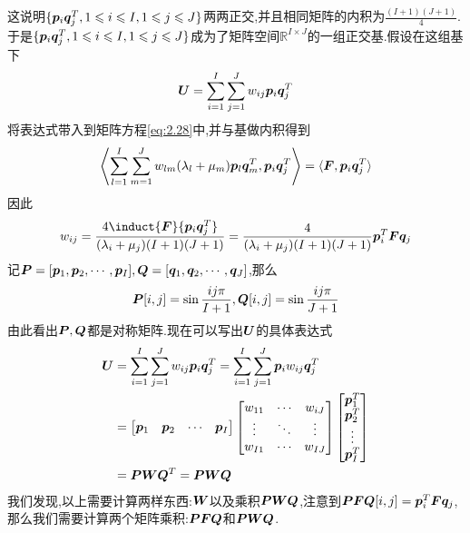 这说明$\{\bm{p}_i\bm{q}_j^T,1\leqslant i\leqslant I,1\leqslant j\leqslant J\}$两两正交,并且相同矩阵的内积为$\frac{(I+1)(J+1)}{4}$.于是$\{\bm{p}_i\bm{q}_j^T,1\leqslant i\leqslant I,1\leqslant j\leqslant J\}$成为了矩阵空间$\mathbb{R}^{I\times J}$的一组正交基.假设在这组基下
$$
\bm{U}=\sum_{i=1}^I\sum_{j=1}^Jw_{ij}\bm{p}_i\bm{q}_j^T
$$
将表达式带入到矩阵方程\eqref{eq:2.28}中,并与基做内积得到
$$
\left\langle \sum_{l=1}^I\sum_{m=1}^Jw_{lm}(\lambda_l+\mu_m)\bm{p}_l\bm{q}_m^T, \bm{p}_i\bm{q}_j^T\right\rangle = \langle \bm{F},\bm{p}_i\bm{q}_j^T \rangle 
$$
因此
$$
w_{ij}=\frac{4\induct{\vecb{F}}{\vecb{p}_i\vecb{q}_j^T}}{(\lambda_i+\mu_j)(I+1)(J+1)}=\frac{4}{(\lambda_i+\mu_j)(I+1)(J+1)}\vecb{p}_i^T\vecb{F}\vecb{q}_j
$$
\qquad 记$\bm{P}=[\bm{p}_1,\bm{p}_2,\cdots,\bm{p}_I],\bm{Q}=[\bm{q}_1,\bm{q}_2,\cdots,\bm{q}_J]$,那么
$$
\bm{P}[i,j]=\sin\frac{ij\pi}{I+1},\bm{Q}[i,j]=\sin\frac{ij\pi}{J+1}
$$
由此看出$\bm{P},\bm{Q}$都是对称矩阵.现在可以写出$\bm{U}$的具体表达式
$$
\begin{aligned}
    \bm{U} &= \sum_{i=1}^I\sum_{j=1}^Jw_{ij}\bm{p}_i\bm{q}_j^T=\sum_{i=1}^I\sum_{j=1}^J\bm{p}_i w_{ij}\bm{q}_j^T\\
             &= 
             \begin{bmatrix}
                \bm{p}_1 & \bm{p}_2 & \cdots & \bm{p}_I
             \end{bmatrix}
             \begin{bmatrix}
                w_{11} & \cdots & w_{iJ}\\
                \vdots & \ddots & \vdots\\
                w_{I1} & \cdots & w_{IJ}
             \end{bmatrix}
             \begin{bmatrix}
                \bm{p}_1^T \\
                \bm{p}_2^T \\
                \vdots\\
                \bm{p}_I^T
             \end{bmatrix}\\
             &= \bm{P}\bm{W}\bm{Q}^T=\bm{P}\bm{W}\bm{Q}
\end{aligned}
$$
我们发现,以上需要计算两样东西:$\bm{W}$以及乘积$\bm{P}\bm{W}\bm{Q}$,注意到$\bm{P}\bm{F}\bm{Q}[i,j]=\bm{p}_i^T\bm{F}\bm{q}_j$,那么我们需要计算两个矩阵乘积:$\bm{P}\bm{F}\bm{Q}$和$\bm{P}\bm{W}\bm{Q}$.\par

